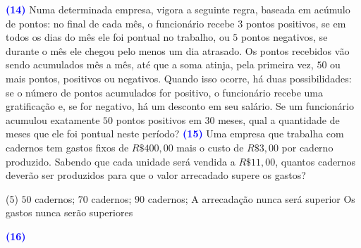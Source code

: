 \documentclass[12pt, a4paper]{article}
\newcommand{\negrito}[1]{\mbox{\boldmath{$#1$}}}
\begin{document}
\textcolor{blue}{\bf(14)} Numa determinada empresa, vigora a seguinte regra, baseada em acúmulo de pontos: no final de cada mês, o funcionário recebe $3$ pontos positivos, se em todos os dias do mês ele foi pontual no trabalho, ou $5$ pontos negativos, se durante o mês ele chegou pelo menos um dia atrasado. Os pontos recebidos vão sendo acumulados mês a mês, até que a soma atinja, pela primeira vez, $50$ ou mais pontos, positivos ou negativos. Quando isso ocorre, há duas possibilidades: se o número de pontos acumulados for positivo, o funcionário recebe uma gratificação e, se for negativo, há um desconto em seu salário. Se um funcionário acumulou exatamente $50$ pontos positivos em $30$ meses, qual a quantidade de meses que ele foi pontual neste período?
\newline\newline
\textcolor{blue}{\bf(15)} Uma empresa que trabalha com cadernos tem gastos fixos de $R\$ 400,00$ mais o custo de $R\$ 3,00$ por caderno produzido. Sabendo que cada unidade será vendida a $R\$ 11,00$, quantos cadernos deverão ser produzidos para que o valor arrecadado supere os gastos?
\begin{tasks}[counter-format={(tsk[a])},label-width=3.6ex, label-format = {\bfseries}, column-sep = {0pt}](5)
\task[\textcolor{Floresta}{$\negrito{(a)} $}] $50$ cadernos;
\task[\textcolor{Floresta}{$\negrito{(b)} $}] $70$ cadernos;
\task[\textcolor{Floresta}{$\negrito{(c)} $}] $90$ cadernos;
\task[\textcolor{Floresta}{$\negrito{(d)} $}] A arrecadação nunca será superior
\task[\textcolor{Floresta}{$\negrito{(e)} $}] Os gastos nunca serão superiores
\end{tasks}
\textcolor{blue}{\bf(16)} 
\end{document}
